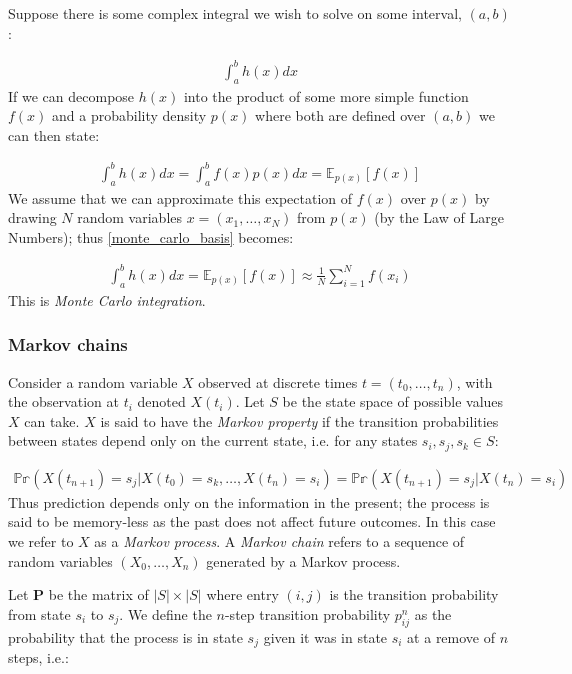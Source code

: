 \documentclass[12pt]{article} %
\begin{document}
Suppose there is some complex integral we wish to solve on some interval, $(a,b)$:

\begin{align}
\int_a^b h(x) dx
\end{align}
If we can decompose $h(x)$ into the product of some more simple function $f(x)$ and a probability density $p(x)$ where both are defined over $(a,b)$ we can then state:

\begin{align} \label{monte_carlo_basis}
\int_a^bh(x)dx = \int_a^bf(x)p(x)dx = \mathbb{E}_{p(x)}\left[f(x)\right]
\end{align}
We assume that we can approximate this expectation of $f(x)$ over $p(x)$ by drawing $N$ random variables $x = (x_1,\ldots,x_N)$ from $p(x)$ (by the Law of Large Numbers); thus \eqref{monte_carlo_basis} becomes:

\begin{align} \label{monte_carlo_integration}
\int_a^bh(x)dx = \mathbb{E}_{p(x)}\left[f(x)\right] \approx \frac{1}{N}\sum_{i=1}^Nf(x_i)
\end{align}
This is \emph{Monte Carlo integration}.

\subsubsection{Markov chains}
Consider a random variable $X$ observed at discrete times $t = (t_0,\ldots,t_n)$, with the observation at $t_i$ denoted $X(t_i)$. Let $S$ be the state space of possible values $X$ can take. $X$ is said to have the \emph{Markov property} if the transition probabilities between states depend only on the current state, i.e. for any states $s_i, s_j, s_k \in S$:

\begin{align}
\mathbb{Pr}(X(t_{n+1}) = s_j | X(t_0) = s_k, \ldots, X(t_n) = s_i) = \mathbb{Pr}(X(t_{n+1}) = s_j | X(t_n) = s_i) 
\end{align}
Thus prediction depends only on the information in the present; the process is said to be memory-less as the past does not affect future outcomes. In this case we refer to $X$ as a \emph{Markov process}. A \emph{Markov chain} refers to a sequence of random variables $(X_0,\ldots,X_n)$ generated by a Markov process.

Let $\mathbf{P}$ be the matrix of $|S| \times |S|$ where entry $(i,j)$ is the transition probability from state $s_i$ to $s_j$. We define the $n$-step transition probability $p_{ij}^n$ as the probability that the process is in state $s_j$ given it was in state $s_i$ at a remove of $n$ steps, i.e.:
\end{document}
